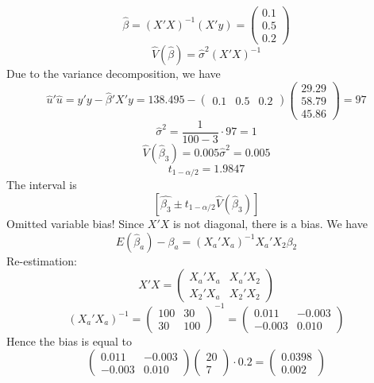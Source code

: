 \documentclass{article}
\begin{document}
\begin{Answer}
\Question
$$\hat{\beta}=(X'X)^{-1}(X'y) = \begin{pmatrix}0.1\\0.5\\0.2\end{pmatrix}$$
$$\hat{V}(\hat{\beta}) = \hat{\sigma}^2 (X'X)^{-1}$$
Due to the variance decomposition, we have
$$\hat{u}'\hat{u} = y'y - \hat{\beta}'X'y = 138.495 - \begin{pmatrix}0.1 & 0.5 & 0.2\end{pmatrix} \begin{pmatrix} 29.29\\58.79\\45.86\end{pmatrix} = 97$$
$$\hat{\sigma}^2 = \frac{1}{100-3} \cdot 97 = 1$$
$$\hat{V}(\hat{\beta}_3) = 0.005 \hat{\sigma}^2 = 0.005$$
$$t_{1-\alpha/2} = 1.9847$$
The interval is
$$[\hat{\beta_3} \pm t_{1-\alpha/2} \hat{V}(\hat{\beta}_3)]$$
\Question
Omitted variable bias! Since $X'X$ is not diagonal, there is a bias.
\Question
We have $$E(\hat{\beta}_a)-\beta_a = (X_a'X_a)^{-1} X_a'X_2\beta_2$$
Re-estimation:
$$X'X = \begin{pmatrix} X_a'X_a & X_a'X_2\\ X_2' X_a & X_2'X_2\end{pmatrix}$$
$$(X_a'X_a)^{-1} = \begin{pmatrix} 100 & 30 \\ 30 &100 \end{pmatrix}^{-1} = \begin{pmatrix}0.011 & -0.003 \\ -0.003 & 0.010\end{pmatrix}$$
Hence the bias is equal to
$$\begin{pmatrix}0.011 & -0.003 \\ -0.003 & 0.010\end{pmatrix}\begin{pmatrix}20\\7\end{pmatrix} \cdot 0.2 = \begin{pmatrix}0.0398\\0.002\end{pmatrix}$$
\end{Answer}
\newpage
\end{document}

